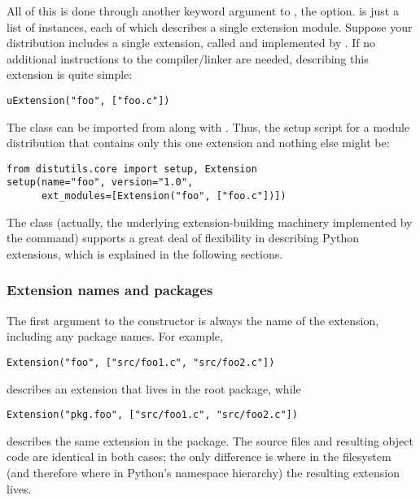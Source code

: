 \documentclass{howto}
\begin{document}
All of this is done through another keyword argument to
, the  option.  
is just a list of  instances, each of which describes a
single extension module.  Suppose your distribution includes a single
extension, called  and implemented by .  If no
additional instructions to the compiler/linker are needed, describing
this extension is quite simple:

\begin{verbatim}
uExtension("foo", ["foo.c"])
\end{verbatim}

The  class can be imported from
 along with .  Thus, the setup
script for a module distribution that contains only this one extension
and nothing else might be:

\begin{verbatim}
from distutils.core import setup, Extension
setup(name="foo", version="1.0",
      ext_modules=[Extension("foo", ["foo.c"])])
\end{verbatim}

The  class (actually, the underlying extension-building
machinery implemented by the  command) supports a
great deal of flexibility in describing Python extensions, which is
explained in the following sections.  


\subsubsection{Extension names and packages}

The first argument to the  constructor is always the
name of the extension, including any package names.  For example,

\begin{verbatim}
Extension("foo", ["src/foo1.c", "src/foo2.c"])
\end{verbatim}

describes an extension that lives in the root package, while

\begin{verbatim}
Extension("pkg.foo", ["src/foo1.c", "src/foo2.c"])
\end{verbatim}

describes the same extension in the  package.  The source
files and resulting object code are identical in both cases; the only
difference is where in the filesystem (and therefore where in Python's
namespace hierarchy) the resulting extension lives.
\end{document}
